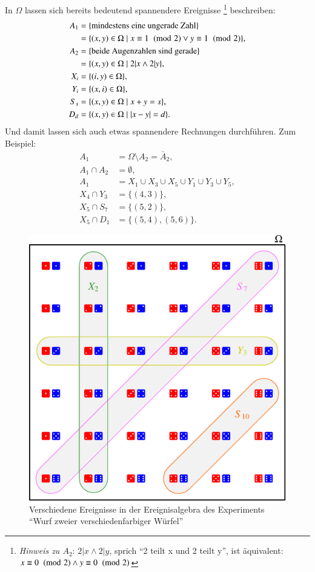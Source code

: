 In $\Omega$ lassen sich bereits bedeutend spannendere Ereignisse%
\footnote{\textit{Hinweis zu $A_2$}: $2|x \wedge 2|y$, sprich
	``2 teilt x und 2 teilt y'', ist äquivalent:
	$x \equiv 0 \imod{2} \wedge y \equiv 0 \imod{2}$
} beschreiben:
\begin{align*}
A_1&=\{\text{mindestens eine ungerade Zahl}\}\\
   &=\{(x,y)\in\Omega\;|\;x \equiv 1 \imod{2} \vee y\equiv 1 \imod{2}\},\\
A_2&=\{\text{beide Augenzahlen sind gerade}\}\\
   &=\{(x,y)\in\Omega\;|\;2|x \wedge 2|y\},\\
X_i&=\{(i,y)\in\Omega\},\\
Y_i&=\{(x,i)\in\Omega\},\\
S_s&=\{(x,y)\in\Omega\;|\; x + y = s\},\\
D_d&=\{(x,y)\in\Omega\;|\; |x - y| = d\}.
\end{align*}
Und damit lassen sich auch etwas spannendere Rechnungen durchführen.
Zum Beispiel:
\begin{align*}
A_1&=\Omega \setminus A_2 = \bar A_2,\\
A_1\cap A_2&=\emptyset,\\
A_1&=X_1\cup X_3 \cup X_5\cup Y_1\cup Y_3\cup Y_5,\\
X_4\cap Y_3&=\{(4,3)\},\\
X_5\cap S_7&=\{(5,2)\},\\
X_5\cap D_1&=\{(5,4), (5,6)\}.
\end{align*}
\begin{figure}
\centering
\includegraphics{images/zweiwuerfel-1.pdf}
\caption{Verschiedene Ereignisse in der Ereignisalgebra des Experiments
``Wurf zweier verschiedenfarbiger Würfel\label{zweiwuerfel}''}
\end{figure}

